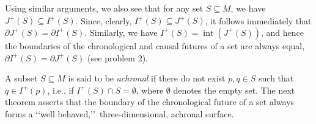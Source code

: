 Using similar arguments, we also see that for any set \(S\subseteq M\), we have
\(J^+(S)\subseteq\overline{I^+(S)}\). Since, clearly, \(I^+(S)\subseteq J^+(S)\),
it follows immediately that \(\partial J^+(S)=\partial I^+(S)\). Similarly, we
have \(I^+(S)=\operatorname{int}(J^+(S))\), and hence the boundaries of the
chronological and causal futures of a set are always equal,
\(\partial I^+(S)=\partial J^+(S)\) (see problem 2).

A subset \(S\subseteq M\) is said to be \emph{achronal} if there do not exist
\(p,q\in S\) such that \(q\in I^+(p)\), i.e., if \(I^+(S)\cap S=\emptyset\),
where \(\emptyset\) denotes the empty set. The next theorem asserts that the
boundary of the chronological future of a set always forms a \lq\lq well behaved,\rq\rq\
three-dimensional, achronal surface.

